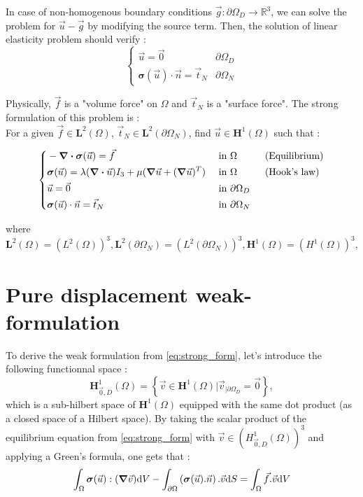\documentclass[a4paper,12pt,twoside]{report}
\newcommand{\mtr}{\mathbb{R}}
\newcommand{\dif}{\mathrm{d}}
\begin{document}
In case of non-homogenous boundary conditions $\vec g : \partial \Omega_D \rightarrow \mtr^3$, we can solve the problem for $\vec u - \vec g$ by modifying the source term. Then, the solution of linear elasticity problem should verify :
$$
\left\{ \begin{array}{ll}
\vec u = \vec 0 & \partial \Omega_D \\
\boldsymbol{\sigma} (\vec u) \cdot \vec n = \vec t_N & \partial \Omega_N
\end{array} \right.
$$

Physically, $\vec f$ is a "volume force" on $\Omega$ and $\vec t_N$ is a "surface force". 
The strong formulation of this problem is : \\
For a given $\vec f \in \boldsymbol L^2(\Omega)$, $\vec t_N \in \boldsymbol L^2(\partial \Omega_N)$, find $\vec u \in \boldsymbol H^1(\Omega)$ such that : 

\begin{equation}
\label{eq:strong_form}
\left \{
\begin{aligned}
    & - \div \boldsymbol{\sigma} (\vec u) = \vec f & \text{ in } & \Omega \hspace{1cm} \text{(Equilibrium)}\\
    & \boldsymbol{\sigma} (\vec u) = \lambda (\div \vec u) I_3 + \mu (\grad \vec u + (\grad \vec u)^T) & \text{ in }& \Omega \hspace{1cm} \text{(Hook's law)} \\
    & \vec u = \vec 0 & \text{ in } &\partial \Omega_D \\
    & \boldsymbol{\sigma} (\vec u) \cdot \vec n = \vec t_N & \text{ in }& \partial \Omega_N
\end{aligned}
\right.
\end{equation}

where $\boldsymbol L^2(\Omega) = \left(L^2(\Omega) \right)^3, \boldsymbol L^2(\partial \Omega_N) = \left(L^2(\partial \Omega_N) \right)^3, \boldsymbol H^1(\Omega) = \left(H^1(\Omega) \right)^3, $

\section{Pure displacement weak-formulation} \label{sec:Pure displacement weak-formulation}

To derive the weak formulation from \eqref{eq:strong_form}, let's introduce the following functionnal space : $$\boldsymbol H^1_{\vec 0,D}(\Omega) = \left\{ \vec v \in \boldsymbol H^1(\Omega) \Big| \vec v_{|\partial\Omega_D} = \vec 0 \right\},$$
which is a sub-hilbert space of $\boldsymbol H^1(\Omega)$ equipped with the same dot product (as a closed space of a Hilbert space). By taking the scalar product of the equilibrium equation from \eqref{eq:strong_form} with $\vec v \in \left(H^1_{\vec 0,D}(\Omega) \right)^3$ and applying a Green's formula, one gets that :
$$\int_\Omega \boldsymbol{\sigma} (\vec u) : (\grad \vec v) \dif V - \int_{\partial\Omega} \left(\boldsymbol{\sigma} (\vec u).\vec n \right).\vec v \dif S = \int_\Omega \vec f . \vec v \dif V$$
\end{document}
